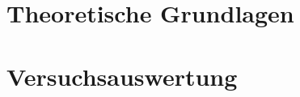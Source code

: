 \documentclass{include/thesisclass}
\begin{document}
	\FrontMatter
	
	\tableofcontents                  
	\newpage
	\MainMatter


\chapter{Theoretische Grundlagen}

\chapter{Versuchsauswertung}
\end{document}
